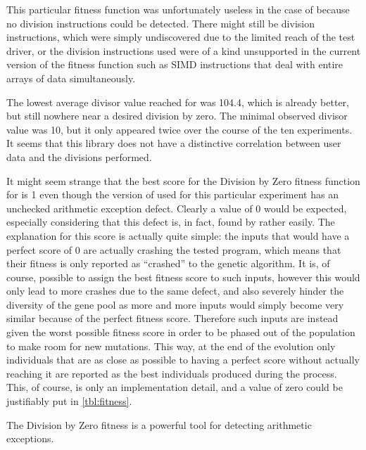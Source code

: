 This particular fitness function was unfortunately useless in the case of \libpcap because no division
instructions could be detected. There might still be division instructions, which were simply undiscovered due
to the limited reach of the test driver, or the division instructions used were of a kind unsupported in the
current version of the fitness function such as SIMD instructions that deal with entire arrays of data
simultaneously.

The lowest average divisor value reached for \libxml was 104.4, which is already better, but still nowhere near
a desired division by zero. The minimal observed divisor value was 10, but it only appeared twice over the
course of the ten experiments. It seems that this library does not have a distinctive correlation between user
data and the divisions performed.

It might seem strange that the best score for the Division by Zero fitness function for \libpng is 1 even
though the version of \libpng used for this particular experiment has an unchecked arithmetic exception
defect. Clearly a value of 0 would be expected, especially considering that this defect is, in
fact, found by \xmlmate rather easily. The explanation for this score is actually quite simple: the inputs
that would have a perfect score of 0 are actually crashing the tested program, which means that their
fitness is only reported as ``crashed'' to the genetic algorithm. It is, of course, possible to assign
the best fitness score to such inputs, however this would only lead to more crashes due to the same
defect, and also severely hinder the diversity of the gene pool as more and more inputs would simply become
very similar because of the perfect fitness score. Therefore such inputs are instead given the worst possible
fitness score in order to be phased out of the population to make room for new mutations. This way, at the end
of the evolution only individuals that are as close as possible to having a perfect score without actually
reaching it are reported as the best individuals produced during the process. This, of course, is only an
implementation detail, and a value of zero could be justifiably put in \cref{tbl:fitness}.

\begin{mdframed}
\centering
The Division by Zero fitness is a powerful tool for detecting arithmetic exceptions.
\end{mdframed}

